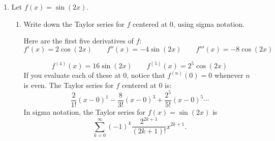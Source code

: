 \documentclass[main]{subfiles}
\begin{document}
\begin{enumerate}
\begin{enumerate}
\begin{solution}
    We know any derivative for $\cos x$ is $\pm \sin x$ or $\pm \cos x$. All of these functions are bounded by 1, so 1 is a reasonable choice for $M_{(n+1)}$.
\end{solution}
\item\begin{problem}[\vfill]
    We are approximating $\cos(\frac{1}{4})$. Give a reasonable $n$ so that the error is definitely less than $2^{-20} $ (which is roughly $10^{-6}$).
\end{problem} 

\begin{solution}
    We see that $|f(x)-P_n(x)|\leq \dfrac{(\frac{1}{4})^{n+1}}{(n+1)!}$. We want this expression to be less than $2^{-20}$ to ensure that the actual error is also smaller than that. Notice that $4^{n+1}=2^{2n+2}$. So we are looking for an $n$ such that $\dfrac{1}{(n+1)!2^{2n+2}}\leq \dfrac{1}{2^{20}}$. If we ignore the $(n+1)!$ (because this only makes the left side smaller, we could find an $n$ such that $\dfrac{1}{2^{2n+2}}\leq \dfrac{1}{2^{20}}$. We simply solve $2n+2=20$, and see that $n=9$ works. Because of the $(n+1)!$ a smaller choice of $n$ also works, indeed $n=6$ is the smallest value for $n$, but 9 is a reasonable choice.
\end{solution}
\end{enumerate}
  
\pspace{\newpage}

  \item Let $f(x) = \sin(2x)$.  
  \begin{enumerate}
    \item
    \begin{problem}[2.0in]
      Write down the Taylor series for $f$ centered at $0$, using sigma notation.  
    \end{problem}


    \begin{solution}
 Here are the first five derivatives of $f$:
    $$
      f'(x) = 2 \cos(2x) \qquad f''(x) = -4 \sin(2x) \qquad f'''(x) = -8 \cos(2x) $$
      
      $$f^{(4)}(x) = 16 \sin(2x) \qquad f^{(5)}(x) = 2^{5} \cos(2x)  $$
    If you evaluate each of these at $0$, notice that $f^{(n)}(0) = 0$ whenever $n$ is even.
    The Taylor series for $f$ centered at $0$ is:
    $$
      \frac{2}{1!} (x-0)^{1} - \frac{8}{3!} (x-0)^{3} + \frac{2^{5}}{5!} (x-0)^{5} \cdots
    $$
    In sigma notation, the Taylor series for $f(x) = \sin(2x)$ is
    $$
      \sum_{k = 0}^{\infty} (-1)^{k} \frac{2^{2k+1}}{(2k+1)!} x^{2k + 1}.
    $$   
    \end{solution}


\end{enumerate}
\end{enumerate}
\end{document}
